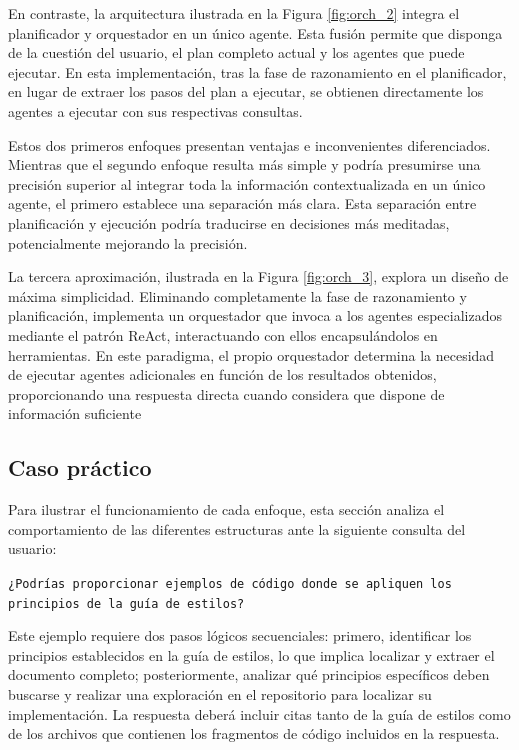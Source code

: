 En contraste, la arquitectura ilustrada en la Figura \ref{fig:orch_2} integra el planificador y orquestador en un único agente. Esta fusión permite que disponga de la cuestión del usuario, el plan completo actual y los agentes que puede ejecutar. En esta implementación, tras la fase de razonamiento en el planificador, en lugar de extraer los pasos del plan a ejecutar, se obtienen directamente los agentes a ejecutar con sus respectivas consultas.

Estos dos primeros enfoques presentan ventajas e inconvenientes diferenciados. Mientras que el segundo enfoque resulta más simple y podría presumirse una precisión superior al integrar toda la información contextualizada en un único agente, el primero establece una separación más clara. Esta separación entre planificación y ejecución podría traducirse en decisiones más meditadas, potencialmente mejorando la precisión.

La tercera aproximación, ilustrada en la Figura \ref{fig:orch_3}, explora un diseño de máxima simplicidad. Eliminando completamente la fase de razonamiento y planificación, implementa un orquestador que invoca a los agentes especializados mediante el patrón ReAct, interactuando con ellos encapsulándolos en herramientas. En este paradigma, el propio orquestador determina la necesidad de ejecutar agentes adicionales en función de los resultados obtenidos, proporcionando una respuesta directa cuando considera que dispone de información suficiente

\subsection{Caso práctico}
Para ilustrar el funcionamiento de cada enfoque, esta sección analiza el comportamiento de las diferentes estructuras ante la siguiente consulta del usuario:

\texttt{¿Podrías proporcionar ejemplos de código donde se apliquen los principios de la guía de estilos?}

Este ejemplo requiere dos pasos lógicos secuenciales: primero, identificar los principios establecidos en la guía de estilos, lo que implica localizar y extraer el documento completo; posteriormente, analizar qué principios específicos deben buscarse y realizar una exploración en el repositorio para localizar su implementación. La respuesta deberá incluir citas tanto de la guía de estilos como de los archivos que contienen los fragmentos de código incluidos en la respuesta.

